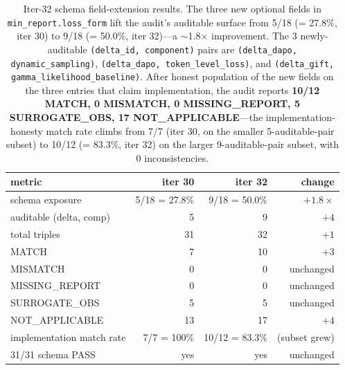 \begin{table}[t]
\centering\small
\caption{Iter-32 schema field-extension results. The three new optional
fields in \texttt{min\_report.loss\_form} lift the audit's auditable
surface from 5/18 (= 27.8\%, iter 30) to 9/18 (= 50.0\%, iter 32)---a
$\sim$1.8$\times$ improvement. The 3 newly-auditable
\texttt{(delta\_id, component)} pairs are
\texttt{(delta\_dapo, dynamic\_sampling)},
\texttt{(delta\_dapo, token\_level\_loss)}, and
\texttt{(delta\_gift, gamma\_likelihood\_baseline)}. After honest
population of the new fields on the three entries that claim
implementation, the audit reports \textbf{10/12 MATCH, 0 MISMATCH, 0
MISSING\_REPORT, 5 SURROGATE\_OBS, 17 NOT\_APPLICABLE}---the
implementation-honesty match rate climbs from 7/7 (iter 30, on the
smaller 5-auditable-pair subset) to 10/12 (= 83.3\%, iter 32) on the
larger 9-auditable-pair subset, with 0 inconsistencies.}
\label{tab:p6-schema-extension}
\begin{tabular}{l r r r}
\toprule
metric & iter 30 & iter 32 & change \\
\midrule
schema exposure           & 5/18 = 27.8\% & 9/18 = 50.0\% & $+1.8\times$ \\
auditable (delta, comp)   & 5             & 9             & $+4$ \\
total triples             & 31            & 32            & $+1$ \\
MATCH                     & 7             & 10            & $+3$ \\
MISMATCH                  & 0             & 0             & unchanged \\
MISSING\_REPORT           & 0             & 0             & unchanged \\
SURROGATE\_OBS            & 5             & 5             & unchanged \\
NOT\_APPLICABLE           & 13            & 17            & $+4$ \\
implementation match rate & 7/7 = 100\%   & 10/12 = 83.3\% & (subset grew) \\
31/31 schema PASS        & yes           & yes           & unchanged \\
\bottomrule
\end{tabular}
\end{table}

